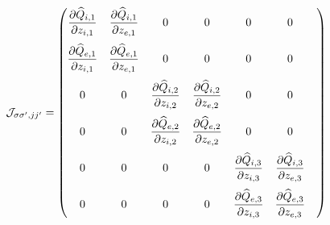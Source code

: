 \documentclass[12pt]{article}
\newcommand\qhat{\widehat{Q}}
\newcommand{\sspjjp}{{\sigma\sigma^\prime,jj^\prime}}
\begin{document}
\begin{equation}
{\cal J}_{\sspjjp} = \begin{pmatrix}
\displaystyle \frac{\partial \qhat_{i,1}}{\partial z_{i,1}} &
\displaystyle \frac{\partial \qhat_{i,1}}{\partial z_{e,1}} &
0 & 0 & 0 & 0 \medskip \\
\displaystyle \frac{\partial \qhat_{e,1}}{\partial z_{i,1}} &
\displaystyle \frac{\partial \qhat_{e,1}}{\partial z_{e,1}} &
0 & 0 & 0 & 0 \medskip \\
0 & 0 &
\displaystyle \frac{\partial \qhat_{i,2}}{\partial z_{i,2}} &
\displaystyle \frac{\partial \qhat_{i,2}}{\partial z_{e,2}} &
0 & 0  \medskip \\
0 & 0 &
\displaystyle \frac{\partial \qhat_{e,2}}{\partial z_{i,2}} &
\displaystyle \frac{\partial \qhat_{e,2}}{\partial z_{e,2}} &
0 & 0  \medskip \\
0 & 0 & 0 & 0 &
\displaystyle \frac{\partial \qhat_{i,3}}{\partial z_{i,3}} &
\displaystyle \frac{\partial \qhat_{i,3}}{\partial z_{e,3}} &
\medskip \\
0 & 0 & 0 & 0 &
\displaystyle \frac{\partial \qhat_{e,3}}{\partial z_{i,3}} &
\displaystyle \frac{\partial \qhat_{e,3}}{\partial z_{e,3}} &
\end{pmatrix}
\end{equation}
\end{document}
